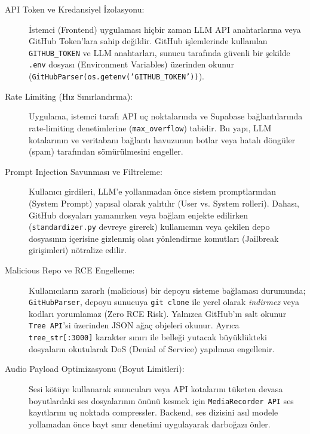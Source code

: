 \documentclass[12pt,a4paper]{article}
\begin{document}
\begin{description}
    \item[API Token ve Kredansiyel İzolasyonu:] İstemci (Frontend) uygulaması hiçbir zaman LLM API anahtarlarına veya GitHub Token'lara sahip değildir. GitHub işlemlerinde kullanılan \texttt{GITHUB\_TOKEN} ve LLM anahtarları, sunucu tarafında güvenli bir şekilde \texttt{.env} dosyası (Environment Variables) üzerinden okunur (\texttt{GitHubParser(os.getenv('GITHUB\_TOKEN'))}).
    
    \item[Rate Limiting (Hız Sınırlandırma):] Uygulama, istemci tarafı API uç noktalarında ve Supabase bağlantılarında rate-limiting denetimlerine (\texttt{max\_overflow}) tabidir. Bu yapı, LLM kotalarının ve veritabanı bağlantı havuzunun botlar veya hatalı döngüler (spam) tarafından sömürülmesini engeller.
    
    \item[Prompt Injection Savunması ve Filtreleme:] Kullanıcı girdileri, LLM'e yollanmadan önce sistem promptlarından (System Prompt) yapısal olarak yalıtılır (User vs. System rolleri). Dahası, GitHub dosyaları yamanırken veya bağlam enjekte edilirken (\texttt{standardizer.py} devreye girerek) kullanıcının veya çekilen depo dosyasının içerisine gizlenmiş olası yönlendirme komutları (Jailbreak girişimleri) nötralize edilir.

    \item[Malicious Repo ve RCE Engelleme:] Kullanıcıların zararlı (malicious) bir depoyu sisteme bağlaması durumunda; \texttt{GitHubParser}, depoyu sunucuya \texttt{git clone} ile yerel olarak \emph{indirmez} veya kodları yorumlamaz (Zero RCE Risk). Yalnızca GitHub'ın salt okunur \texttt{Tree API}'si üzerinden JSON ağaç objeleri okunur. Ayrıca \texttt{tree\_str[:3000]} karakter sınırı ile belleği yutacak büyüklükteki dosyaların okutularak DoS (Denial of Service) yapılması engellenir.
    
    \item[Audio Payload Optimizasyonu (Boyut Limitleri):] Sesi kötüye kullanarak sunucuları veya API kotalarını tüketen devasa boyutlardaki ses dosyalarının önünü kesmek için \texttt{MediaRecorder API} ses kayıtlarını uç noktada compressler. Backend, ses dizisini asıl modele yollamadan önce bayt sınır denetimi uygulayarak darboğazı önler.
\end{description}

\end{document}
